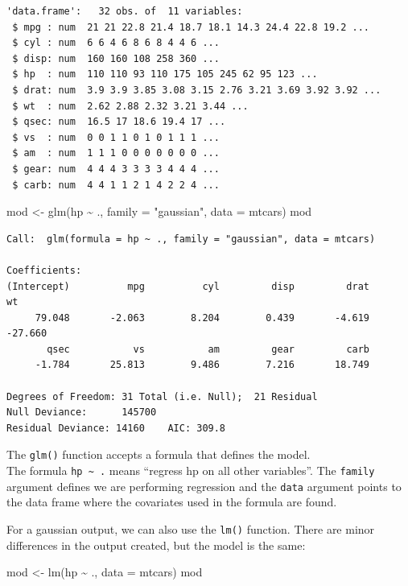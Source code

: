 \documentclass[
]{book}
\newenvironment{Shaded}{\begin{snugshade}}{\end{snugshade}}
\newcommand{\AttributeTok}[1]{\textcolor[rgb]{0.77,0.63,0.00}{#1}}
\newcommand{\FunctionTok}[1]{\textcolor[rgb]{0.00,0.00,0.00}{#1}}
\newcommand{\NormalTok}[1]{#1}
\newcommand{\OtherTok}[1]{\textcolor[rgb]{0.56,0.35,0.01}{#1}}
\newcommand{\SpecialCharTok}[1]{\textcolor[rgb]{0.00,0.00,0.00}{#1}}
\newcommand{\StringTok}[1]{\textcolor[rgb]{0.31,0.60,0.02}{#1}}
\begin{document}
\begin{verbatim}
'data.frame':   32 obs. of  11 variables:
 $ mpg : num  21 21 22.8 21.4 18.7 18.1 14.3 24.4 22.8 19.2 ...
 $ cyl : num  6 6 4 6 8 6 8 4 4 6 ...
 $ disp: num  160 160 108 258 360 ...
 $ hp  : num  110 110 93 110 175 105 245 62 95 123 ...
 $ drat: num  3.9 3.9 3.85 3.08 3.15 2.76 3.21 3.69 3.92 3.92 ...
 $ wt  : num  2.62 2.88 2.32 3.21 3.44 ...
 $ qsec: num  16.5 17 18.6 19.4 17 ...
 $ vs  : num  0 0 1 1 0 1 0 1 1 1 ...
 $ am  : num  1 1 1 0 0 0 0 0 0 0 ...
 $ gear: num  4 4 4 3 3 3 3 4 4 4 ...
 $ carb: num  4 4 1 1 2 1 4 2 2 4 ...
\end{verbatim}

\begin{Shaded}
\begin{Highlighting}[]
\NormalTok{mod }\OtherTok{\textless{}{-}} \FunctionTok{glm}\NormalTok{(hp }\SpecialCharTok{\textasciitilde{}}\NormalTok{ ., }\AttributeTok{family =} \StringTok{"gaussian"}\NormalTok{, }\AttributeTok{data =}\NormalTok{ mtcars)}
\NormalTok{mod}
\end{Highlighting}
\end{Shaded}

\begin{verbatim}
Call:  glm(formula = hp ~ ., family = "gaussian", data = mtcars)

Coefficients:
(Intercept)          mpg          cyl         disp         drat           wt  
     79.048       -2.063        8.204        0.439       -4.619      -27.660  
       qsec           vs           am         gear         carb  
     -1.784       25.813        9.486        7.216       18.749  

Degrees of Freedom: 31 Total (i.e. Null);  21 Residual
Null Deviance:      145700 
Residual Deviance: 14160    AIC: 309.8
\end{verbatim}

The \texttt{glm()} function accepts a formula that defines the model.\\
The formula \texttt{hp\ \textasciitilde{}\ .} means ``regress hp on all other variables''. The \texttt{family} argument defines we are performing regression and the \texttt{data} argument points to the data frame where the covariates used in the formula are found.

For a gaussian output, we can also use the \texttt{lm()} function. There are minor differences in the output created, but the model is the same:

\begin{Shaded}
\begin{Highlighting}[]
\NormalTok{mod }\OtherTok{\textless{}{-}} \FunctionTok{lm}\NormalTok{(hp }\SpecialCharTok{\textasciitilde{}}\NormalTok{ ., }\AttributeTok{data =}\NormalTok{ mtcars)}
\NormalTok{mod}
\end{Highlighting}
\end{Shaded}
\end{document}
